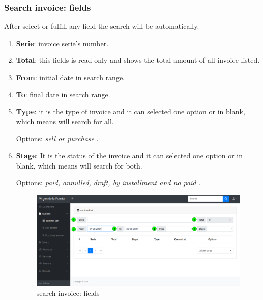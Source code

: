 \documentclass[a4paper,11pt]{refart}
\begin{document}
\subsubsection{Search invoice: fields}\label{invoice:invoice_search}
After select or fulfill any field the search will be automatically.
\begin{enumerate}
	\item \textbf{Serie}: invoice serie's number.
	\item \textbf{Total}: this fields is read-only and shows the total amount of all invoice listed.
	\item \textbf{From}: initial date in search range.
	\item \textbf{To}: final date in search range.
	\item \textbf{Type}: it is the type of invoice and it can selected one option or in blank, which means will search for all.
		\medskip
		\begin{leftbar}
			Options: \emph{sell or purchase} .
		\end{leftbar}
	\item \textbf{Stage}: It is the status of the invoice and it can selected one option or in blank, which means will search for both.
		\medskip
		\begin{leftbar}
			Options: \emph{paid, annulled, draft, by installment and no paid} .
		\end{leftbar}
	
	\begin{figure}[H]\centering
		\includegraphics[width=\textwidth]{images/invoice_list-search-fields.png}
		\caption{search invoice: fields}
		\label{fig:invoice_list-search-fields}
	\end{figure}
\end{enumerate}
\end{document}

